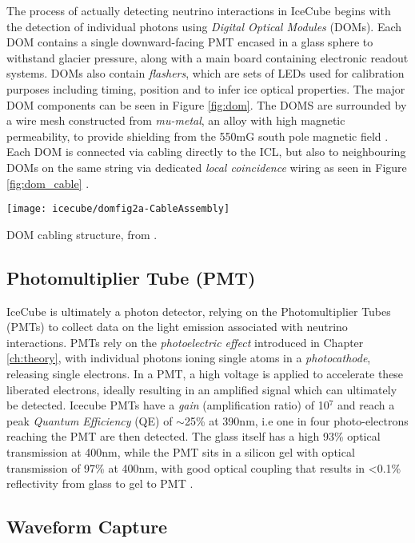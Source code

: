 The process of actually detecting neutrino interactions in IceCube begins with the detection of individual photons using \emph{Digital Optical Modules} (DOMs). Each DOM contains a single downward-facing PMT encased in a glass sphere to withstand glacier pressure, along with a main board containing electronic readout systems. DOMs also contain \emph{flashers}, which are sets of LEDs used for calibration purposes including timing, position and to infer ice optical properties. The major DOM components can be seen in Figure \ref{fig:dom}. The DOMS are surrounded by a wire mesh constructed from \emph{mu-metal}, an alloy with high magnetic permeability, to provide shielding from the 550mG south pole magnetic field \cite{icecube_detector_17}.  Each DOM is connected via cabling directly to the ICL, but also to neighbouring DOMs on the same string via dedicated \emph{local coincidence} wiring as seen in Figure \ref{fig:dom_cable} \cite{icecube_detector_17}.

\begin{marginfigure}
	\centering \texttt{[image: icecube/domfig2a-CableAssembly]}
	\caption{DOM cabling structure, from \cite{icecube_detector_17}.}
	\label{fig:dom_cable}
\end{marginfigure} 

\subsection*{Photomultiplier Tube (PMT)}

IceCube is ultimately a photon detector, relying on the Photomultiplier Tubes (PMTs) to collect data on the light emission associated with neutrino interactions. PMTs rely on the \emph{photoelectric effect} introduced in Chapter \ref{ch:theory}, with individual photons ioning single atoms in a \emph{photocathode}, releasing single electrons. In a PMT, a high voltage is applied to accelerate these liberated electrons, ideally resulting in an amplified signal which can ultimately be detected. Icecube PMTs have a \emph{gain} (amplification ratio) of 10$^{7}$ and reach a peak \emph{Quantum Efficiency} (QE) of $\sim$25\% at 390nm, i.e one in four photo-electrons reaching the PMT are then detected. The glass itself has a high 93\% optical transmission at 400nm, while the PMT sits in a silicon gel with optical transmission of 97\% at 400nm, with good optical coupling that results in <0.1\% reflectivity from glass to gel to PMT \cite{icecube_detector_17}. 

\subsection*{Waveform Capture}

